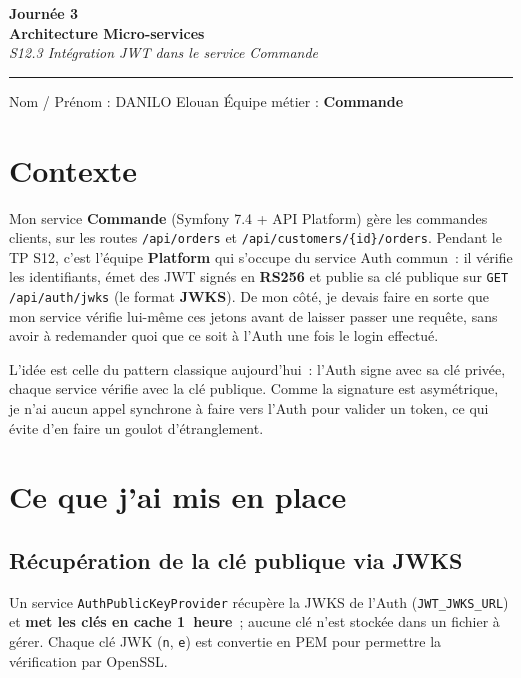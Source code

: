 \documentclass[11pt,a4paper]{article}
\begin{document}
\thispagestyle{empty}
\begin{center}
  {\LARGE\bfseries Journée 3}\\[4pt]
  {\large\bfseries Architecture Micro-services}\\[6pt]
  {\normalsize\itshape S12.3 \textperiodcentered{} Intégration JWT dans le service Commande}\\[6pt]
\end{center}

\vspace{4pt}\hrule\vspace{8pt}

Nom / Prénom : DANILO Elouan \hfill Équipe métier : \textbf{Commande}

\vspace{6pt}

\section{Contexte}

Mon service \textbf{Commande} (Symfony 7.4 + API Platform) gère les commandes clients, sur les
routes \texttt{/api/orders} et \texttt{/api/customers/\{id\}/orders}. Pendant le TP S12, c'est
l'équipe \textbf{Platform} qui s'occupe du service Auth commun~: il vérifie les identifiants,
émet des JWT signés en \textbf{RS256} et publie sa clé publique sur \texttt{GET /api/auth/jwks}
(le format \textbf{JWKS}). De mon côté, je devais faire en sorte que mon service vérifie
lui-même ces jetons avant de laisser passer une requête, sans avoir à redemander quoi que ce
soit à l'Auth une fois le login effectué.

L'idée est celle du pattern classique aujourd'hui~: l'Auth signe avec sa clé privée, chaque
service vérifie avec la clé publique. Comme la signature est asymétrique, je n'ai aucun appel
synchrone à faire vers l'Auth pour valider un token, ce qui évite d'en faire un goulot
d'étranglement.

\section{Ce que j'ai mis en place}

\subsection{Récupération de la clé publique via JWKS}

Un service \texttt{AuthPublicKeyProvider} récupère la JWKS de l'Auth
(\texttt{JWT\_JWKS\_URL}) et \textbf{met les clés en cache 1~heure}~; aucune clé n'est stockée
dans un fichier à gérer. Chaque clé JWK (\texttt{n}, \texttt{e}) est convertie en PEM pour
permettre la vérification par OpenSSL.
\end{document}
